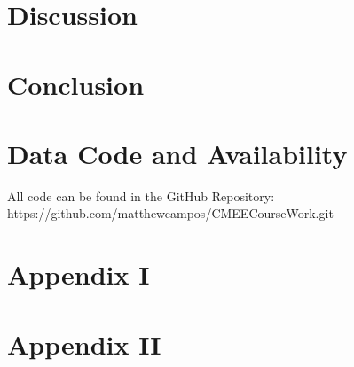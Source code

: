 \documentclass[11pt]{article}
\begin{document}
\section{Discussion}

\section{Conclusion}

\newpage

\section{Data Code and Availability}
All code can be found in the GitHub Repository:\\
{https://github.com/matthewcampos/CMEECourseWork.git}

\newpage




\newpage

\section{Appendix I}

\section{Appendix II}
\end{document}
